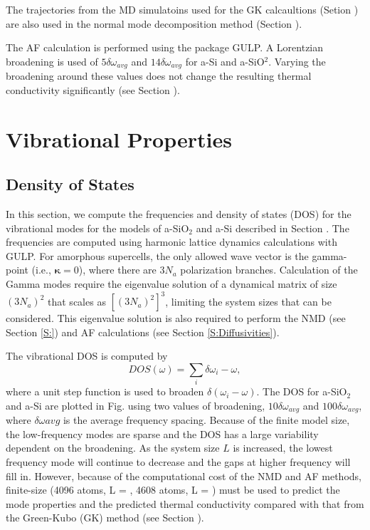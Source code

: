 \documentclass[aps,prb,twocolumn,superscriptaddress,footinbib,amsmath,amssymb,floatfix]{revtex4}
\begin{document}
The trajectories from the MD simulatoins used for the GK 
calcaultions (Setion ) are also used in the normal mode decomposition method 
(Section ).

The AF calculation is performed using the package GULP. A Lorentzian 
broadening is used of $5\delta\omega_{avg}$ and $14\delta\omega_{avg}$ for 
a-Si and a-SiO$^2$. Varying the broadening around these values does not 
change the resulting thermal conductivity significantly (see Section ). 


\section{\label{S:Vibrational}Vibrational Properties}

\subsection{\label{S:DOS}Density of States}

In this section, we compute the frequencies and density of states (DOS)  
for the vibrational modes for the models of a-SiO$_2$ and a-Si described 
in Section . The frequencies 
are computed using harmonic lattice dynamics calculations with  
GULP.\cite{gale_general_2003}   
For amorphous supercells,
the only allowed wave vector is the gamma-point (i.e., $\pmb{\kappa}=0$),  
where there are $3N_a$ polarization branches. Calculation of the 
Gamma modes require the eigenvalue solution of a dynamical matrix of size 
$(3N_a)^2$ that scales as $[(3N_a)^2]^3$, limiting the system 
sizes that can be considered. This eigenvalue solution is also 
required to perform the NMD (see Section \ref{S:})  
and AF calculations (see Section \ref{S:Diffusivities}). 

The vibrational DOS is computed by 
\begin{equation}\label{EQ:DOS}
DOS(\omega) = \sum_i \delta{\omega_i - \omega},
\end{equation}
where a unit step function is used to broaden 
$\delta(\omega_i - \omega)$. 
The DOS for a-SiO$_2$ and a-Si are plotted in Fig. using two values of 
broadening, $10\delta\omega_{avg}$ and $100\delta\omega_{avg}$, where 
$\delta\omega{avg}$ is the average frequency spacing. 
Because of the finite model size, the low-frequency modes are sparse and 
the DOS has a large variability dependent on the broadening.
\cite{feldman_numerical_1999} 
As the system size $L$ is increased, the lowest frequency mode will 
continue to decrease and the gaps at higher frequency will fill in. 
However, because of the computational cost of the NMD and AF methods, 
finite-size (4096 atoms, L = , 4608 atoms, L = ) must be used to predict 
the mode properties and the predicted thermal conductivity compared 
with that from the Green-Kubo (GK) method (see Section ).  
\end{document}
